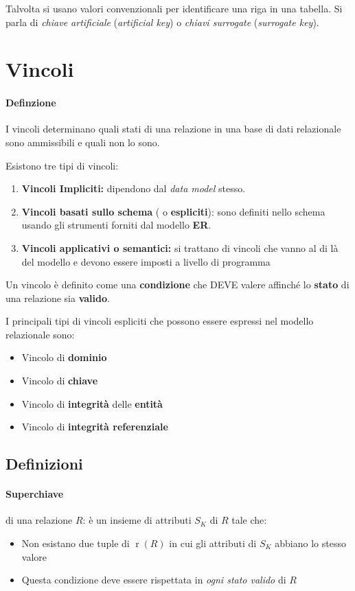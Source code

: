        Talvolta si usano valori convenzionali per identificare una riga in una tabella. Si parla di \textit{chiave artificiale} (\textit{artificial key}) o \textit{chiavi surrogate} (\textit{surrogate key}).
\section{Vincoli}
    \paragraph{Definzione} I vincoli determinano quali stati di una relazione in una base di dati relazionale sono ammissibili e quali non lo sono.
    
    Esistono tre tipi di vincoli:
    \begin{enumerate}
        \item \textbf{Vincoli Impliciti:} dipendono dal \textit{data model} stesso.
        \item \textbf{Vincoli basati sullo schema } ( o \textbf{espliciti}): sono definiti nello schema usando gli strumenti forniti dal modello \textbf{ER}.
        \item \textbf{Vincoli applicativi o semantici:} si trattano di vincoli che vanno al di là del modello e devono essere imposti a livello di programma
    \end{enumerate}
    Un vincolo è definito come una \textbf{condizione} che DEVE valere affinché lo \textbf{stato} di una relazione sia \textbf{valido}. 

    I principali tipi di vincoli espliciti che possono essere espressi nel modello relazionale sono:
    \begin{itemize}
        \item Vincolo di \textbf{dominio}
        \item Vincolo di \textbf{chiave}
        \item Vincolo di \textbf{integrità} delle \textbf{entità}
        \item Vincolo di \textbf{integrità referenziale}
    \end{itemize}
    \subsection{Definizioni}
        \paragraph{Superchiave} di una relazione $ R $: è un insieme di attributi $ S_K $ di $ R $ tale che:
            \begin{itemize}
                \item Non esistano due tuple di $ \operatorname{r}(R) $ in cui gli attributi di $ S_K $ abbiano lo stesso valore
                \item Questa condizione deve essere rispettata in \textit{ogni stato valido} di $ R $
            \end{itemize}
